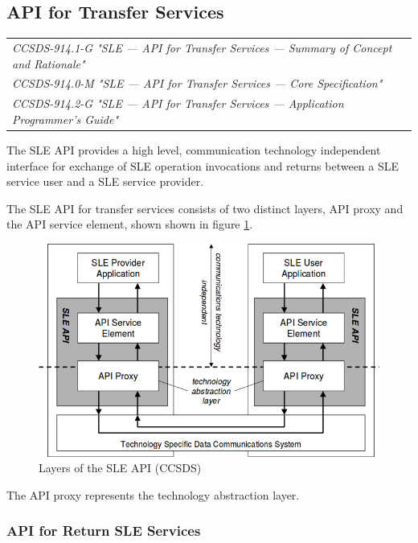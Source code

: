 \subsection{API for Transfer Services}

\begin{tabular}{l}
\textit{CCSDS-914.1-G "SLE — API for Transfer Services — Summary of Concept and Rationale" \cite{CCSDS-914.1-G}} \\
\textit{CCSDS-914.0-M "SLE — API for Transfer Services — Core Specification" \cite{CCSDS-914.0-M}} \\
\textit{CCSDS-914.2-G "SLE — API for Transfer Services — Application Programmer's Guide" \cite{CCSDS-914.2-G}} \\
\end{tabular}

The SLE API provides a high level, communication technology independent interface for exchange of SLE operation invocations and returns between a SLE service user and a SLE service provider. 

The SLE API for transfer services consists of two distinct layers, API proxy and the API service element, shown shown in figure \ref{fig:Layers of the SLE API}.

\begin{figure}[h]
\centering\includegraphics[scale=0.5]{fig/layers_of_the_sle_api}
\caption{Layers of the SLE API (CCSDS)}
\label{fig:Layers of the SLE API}
\end{figure}

The API proxy represents the technology abstraction layer. 

\subsubsection{API for Return SLE Services}

